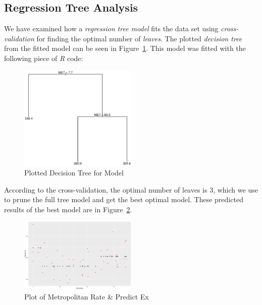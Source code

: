 \documentclass[a4paper, twocolumn]{article}
\begin{document}
    \subsection*{Regression Tree Analysis}

        We have examined how a \emph{regression tree model} fits the data set using \emph{cross-validation} for finding the optimal number of \emph{leaves}. The plotted \emph{decision tree} from the fitted model can be seen in Figure~\ref{fig:tree}. This model was fitted with the following piece of \emph{R} code:

        

        \begin{figure}[h!]
            \centering
            \caption{Plotted Decision Tree for Model}
            \label{fig:tree}
            \includegraphics[width=0.5\textwidth]{share/A1_tree.eps}
        \end{figure}

        According to the cross-validation, the optimal number of leaves is 3, which we use to prune the full tree model and get the best optimal model. These predicted results of the best model are in Figure~\ref{fig:predicted}.

        \begin{figure}[h!]
            \centering
            \caption{Plot of Metropolitan Rate \& Predict Ex}
            \label{fig:predicted}
            \includegraphics[width=0.5\textwidth]{share/A1_fit.eps}
        \end{figure}
\end{document}
